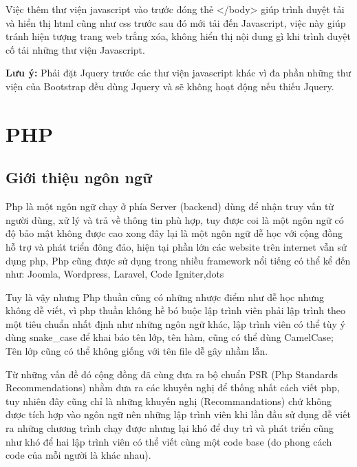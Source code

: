 Việc thêm thư viện javascript vào trước đóng thẻ </body> giúp trình duyệt tải và hiển thị html cũng như css trước sau đó mới tải đến Javascript, việc này giúp tránh hiện tượng trang web trắng xóa, không hiển thị nội dung gì khi trình duyệt cố tải những thư viện Javascript.\par
\textbf{Lưu ý:} Phải đặt Jquery trước các thư viện javascript khác vì đa phần những thư viện của Bootstrap đều dùng Jquery và sẽ không hoạt động nếu thiếu Jquery.
\section{PHP}
\subsection{Giới thiệu ngôn ngữ}
Php là một ngôn ngữ chạy ở phía Server (backend) dùng để nhận truy vấn từ người dùng, xử lý và trả về thông tin phù hợp, tuy được coi là một ngôn ngữ có độ bảo mật không được cao xong đây lại là một ngôn ngữ dễ học với cộng đồng hỗ trợ và phát triển đông đảo, hiện tại phần lớn các website trên internet vẫn sử dụng php, Php cũng được sử dụng trong nhiều framework nổi tiếng có thể kể đến như: Joomla, Wordpress, Laravel, Code Igniter,dots\par
Tuy là vậy nhưng Php thuần cũng có những nhược điểm như dễ học nhưng không dễ viết, vì php thuần không hề bó buộc lập trình viên phải lập trình theo một tiêu chuẩn nhất định như những ngôn ngữ khác, lập trình viên có thể tùy ý dùng snake\_case để khai báo tên lớp, tên hàm, cũng có thể dùng CamelCase; Tên lớp cũng có thể không giống với tên file dễ gây nhầm lẫn.\par
Từ những vấn đề đó cộng đồng đã cùng đưa ra bộ chuẩn PSR (Php Standards Recommendations) nhằm đưa ra các khuyến nghị để thống nhất cách viết php, tuy nhiên đây cũng chỉ là những khuyến nghị (Recommandations) chứ không được tích hợp vào ngôn ngữ nên những lập trình viên khi lần đầu sử dụng dễ viết ra những chương trình chạy được nhưng lại khó để duy trì và phát triển cũng như khó để hai lập trình viên có thể viết cùng một code base (do phong cách code của mỗi người là khác nhau).
